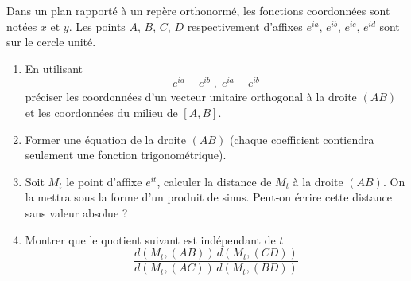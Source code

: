 Dans un plan rapporté à un repère orthonormé, les fonctions coordonnées sont notées $x$ et $y$. \newline
Les points $A$, $B$, $C$, $D$ respectivement d'affixes $e^{ia}$, $e^{ib}$, $e^{ic}$, $e^{id}$ sont sur le cercle unité.
\begin{enumerate}
\item En utilisant
\[e^{ia}+e^{ib}\;,\;e^{ia}-e^{ib}\]
préciser les coordonnées d'un vecteur unitaire orthogonal à la droite $(AB)$ et les coordonnées du milieu de $[A,B]$.
\item Former une équation de la droite  $(AB)$ (chaque coefficient contiendra seulement une fonction trigonométrique).
\item Soit $M_t$ le point d'affixe $e^{it}$, calculer la distance de $M_t$ à la droite $(AB)$. On la mettra sous la forme d'un produit de sinus. Peut-on écrire cette distance sans valeur absolue ?
\item Montrer que le quotient suivant est indépendant de $t$
\[\frac{d(M_t,(AB))\,d(M_t,(CD))}{d(M_t,(AC))\,d(M_t,(BD))}\]
\end{enumerate}